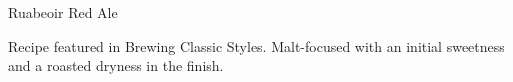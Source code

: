 \begin{recipe}{Ruabeoir Red Ale} %

\begin{aboutblock}
Recipe featured in Brewing Classic Styles. Malt-focused with an initial sweetness
and a roasted dryness in the finish. \sourceaha
\end{aboutblock}


\begin{methodandtiming}

\begin{mashsteps}
\end{mashsteps}

\begin{fermentationsteps}
\end{fermentationsteps}

\end{methodandtiming}

\recipebreak

\begin{ingredientsblock}

\begin{malts}
\end{malts}

\begin{hops}
\end{hops}


\end{ingredientsblock}

\end{recipe}

